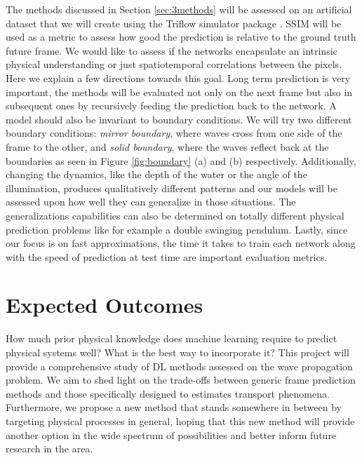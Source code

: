 \documentclass[a4paper,11pt]{article}
\begin{document}
The methods discussed in Section \ref{sec:3methods} will be assessed on an artificial dataset that we will create using the Triflow simulator package \cite{CELLIER_2018triflow}. SSIM will be used as a metric to assess how good the prediction is relative to the ground truth future frame. We would like to assess if the networks encapsulate an intrinsic physical understanding or just spatiotemporal correlations between the pixels. Here we explain a few directions towards this goal. Long term prediction is very important, the methods will be evaluated not only on the next frame but also in subsequent ones by recursively feeding the prediction back to the network. A model should also be invariant to boundary conditions. We will try two different boundary conditions: \textit{mirror boundary}, where waves cross from one side of the frame to the other, and \textit{solid boundary}, where the waves reflect back at the boundaries as seen in Figure \ref{fig:boundary} (a) and (b) respectively. Additionally, changing the dynamics, like the depth of the water or the angle of the illumination, produces qualitatively different patterns and our models will be assessed upon how well they can generalize in those situations. The generalizations capabilities can also be determined on totally different physical prediction problems like for example a double swinging pendulum. Lastly, since our focus is on fast approximations, the time it takes to train each network along with the speed of prediction at test time are important evaluation metrics.

\vskip -10mm

\section{Expected Outcomes}\label{sec:5outcomes}

How much prior physical knowledge does machine learning require to predict physical systems well? What is the best way to incorporate it? This project will provide a comprehensive study of DL methods assessed on the wave propagation problem. We aim to shed light on the trade-offs between generic frame prediction methods and those specifically designed to estimates transport phenomena. Furthermore, we propose a new method that stands somewhere in between by targeting physical processes in general, hoping that this new method will provide another option in the wide spectrum of possibilities and better inform future research in the area.
\end{document}
